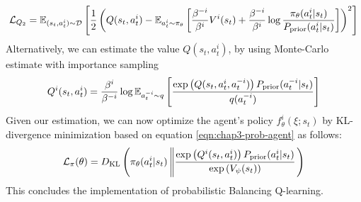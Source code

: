 \begin{equation}
    \mathcal{L}_{Q_2} = \mathbb{E}_{(s_t, a^{i}_t) \sim \mathcal{D}}\left[ \frac{1}{2}\left( Q(s_t, a^{i}_t) - \mathbb{E}_{a^i_t \sim \pi_\theta}\left[ \frac{\beta^{-i}}{\beta^i}V^i(s_t) + \frac{\beta^{-i}}{\beta^i}\log \frac{\pi_\theta(a^i_t | s_t)}{P_{\text{prior}}(a^i_t | s_t)} \right] \right)^2 \right]
\end{equation}
Alternatively, we can estimate the value $Q(s_t, a^{i}_t)$, by using Monte-Carlo estimate with importance sampling 
\begin{equation}
    Q^i(s_t, a^{i}_t) = \frac{\beta^{i}}{\beta^{-i}}\log \mathbb{E}_{a^{-i}_t \sim q}\left[ \frac{\exp\left( Q(s_t, a^{i}_t, a^{-i}_t) \right) P_{\text{prior}}(a^{-i}_t | s_t)}{q(a^{-i}_t)} \right]
\end{equation}
Given our estimation, we can now optimize the agent's policy $f^{i}_\theta(\xi ; s_t)$ by KL-divergence minimization based on equation \ref{eqn:chap3-prob-agent} as follows:
\begin{equation}
    \mathcal{L}_\pi(\theta) = D_{\mathrm{KL}}\left( \pi_\theta(a^{i}_t | s_t) \left\| \frac{\exp \left( Q^i(s_t, a^{i}_t) \right) P_{\text{prior}}(a^i_t | s_t)}{\exp\left( V_\psi(s_t) \right)} \right. \right)
\end{equation}
This concludes the implementation of probabilistic Balancing Q-learning. 
